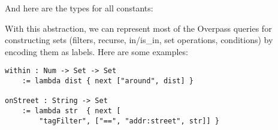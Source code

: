 \documentclass[main.tex]{subfiles}
\begin{document}
And here are the types for all constants:


With this abstraction, we can represent most of the Overpass queries for
constructing sets (filters, recurse, in/is_in, set operations, conditions)
by encoding them as labels. Here are some examples:

\begin{lstlisting}
within : Num -> Set -> Set
    := lambda dist { next ["around", dist] }

onStreet : String -> Set
    := lambda str  { next [
        "tagFilter", ["==", "addr:street", str]] }
\end{lstlisting}
\end{document}
